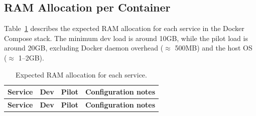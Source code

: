 \subsection{RAM Allocation per Container}
\label{appendix:ram-allocation}

Table~\ref{tab:ram-allocation} describes the expected RAM allocation for
each service in the Docker Compose stack. The minimum dev load is around
10GB, while the pilot load is around 20GB, excluding Docker daemon
overhead ($\approx$ 500MB) and the host OS ($\approx$ 1--2GB).

\begin{longtable}{|p{3.7cm}|p{1.5cm}|p{1.8cm}|p{6cm}|}
\caption{Expected RAM allocation for each service.}
\label{tab:ram-allocation} \\
\hline
\textbf{Service} & \textbf{Dev} & \textbf{Pilot} & \textbf{Configuration notes} \\
\hline
\endfirsthead
\hline
\textbf{Service} & \textbf{Dev} & \textbf{Pilot} & \textbf{Configuration notes} \\
\hline
\endhead


\end{longtable}

